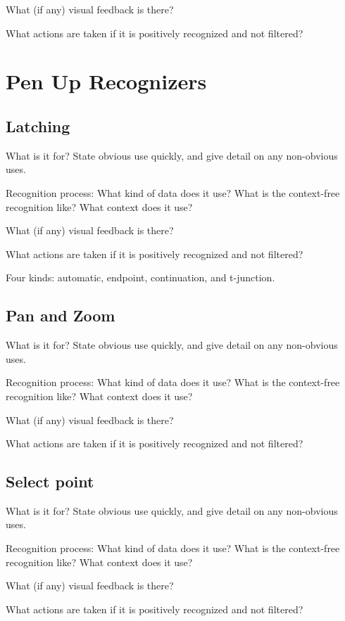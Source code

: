 What (if any) visual feedback is there?

What actions are taken if it is positively recognized and not
filtered?

\section{Pen Up Recognizers}

\subsection{Latching}

What is it for? State obvious use quickly, and give detail on any
non-obvious uses.

Recognition process: What kind of data does it use? What is the
context-free recognition like? What context does it use?

What (if any) visual feedback is there?

What actions are taken if it is positively recognized and not
filtered?

Four kinds: automatic, endpoint, continuation, and t-junction.

\subsection{Pan and Zoom}

What is it for? State obvious use quickly, and give detail on any
non-obvious uses.

Recognition process: What kind of data does it use? What is the
context-free recognition like? What context does it use?

What (if any) visual feedback is there?

What actions are taken if it is positively recognized and not
filtered?

\subsection{Select point}

What is it for? State obvious use quickly, and give detail on any
non-obvious uses.

Recognition process: What kind of data does it use? What is the
context-free recognition like? What context does it use?

What (if any) visual feedback is there?

What actions are taken if it is positively recognized and not
filtered?

